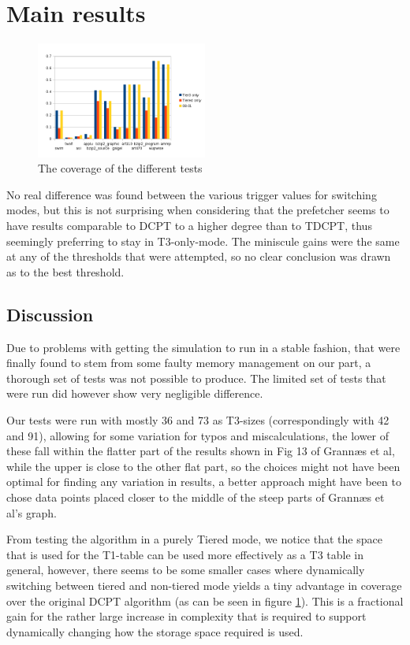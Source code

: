 \section{Main results}
\begin{figure}
\includegraphics[width=0.5\textwidth]{images/dmarkchart.png}
\caption{The coverage of the different tests}
\label{fig:chart}
\end{figure}
No real difference was found between the various trigger values for switching modes,
but this is not surprising when considering that the prefetcher seems to have results
comparable to DCPT to a higher degree than to TDCPT, thus seemingly preferring to stay
in T3-only-mode. The miniscule gains were the same at any of the thresholds that were
attempted, so no clear conclusion was drawn as to the best threshold.

\subsection{Discussion}
Due to problems with getting the simulation to run in a stable fashion, that
were finally found to stem from some faulty memory management on our part, a
thorough set of tests was not possible to produce. The limited set of tests
that were run did however show very negligible difference.

Our tests were run with mostly 36 and 73 as T3-sizes (correspondingly with 42 and 91),
allowing for some variation for typos and miscalculations, the lower of these fall within the
flatter part of the results shown in Fig 13 of Grannæs et al, while the upper is close to the
other flat part, so the choices might not have been optimal for finding any variation in results,
a better approach might have been to chose data points placed closer to the middle of the steep parts
of Grannæs et al's graph.

From testing the algorithm in a purely Tiered mode, we notice that the
space that is used for the T1-table can be used more effectively as a T3
table in general, however, there seems to be some smaller cases where dynamically
switching between tiered and non-tiered mode yields a tiny advantage in coverage
over the original DCPT algorithm (as can be seen in figure \ref{fig:chart}). 
This is a fractional gain for the rather
large increase in complexity that is required to support dynamically changing how
the storage space required is used.


